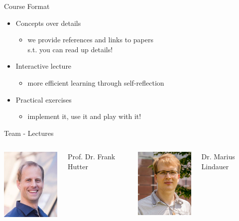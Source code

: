 \begin{frame}[c]{Course Format}

\begin{itemize}
	\item Concepts over details
	\begin{itemize}
	  \item we provide references and links to papers\\ s.t. you can read up details!
	\end{itemize}
	\smallskip
	\item Interactive lecture
	\begin{itemize}
	  \item more efficient learning through self-reflection
	\end{itemize}
	\smallskip
	\item Practical exercises
	\begin{itemize}
	  \item implement it, use it and play with it!
	\end{itemize}
\end{itemize}

\end{frame}
\begin{frame}[c]{Team - Lectures}

\begin{columns}[T]

\centering
\includegraphics[width=9em]{images/frank_small}

Prof. Dr. Frank Hutter

\centering
\includegraphics[width=9em]{images/marius}

Dr. Marius Lindauer



\end{columns}

\end{frame}
